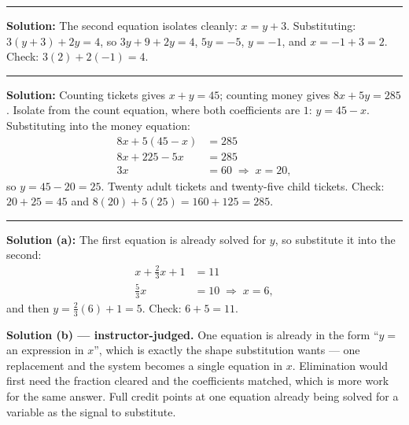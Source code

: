 \documentclass[12pt]{article}
\begin{document}
\vspace{0.15cm}\noindent\rule{\linewidth}{0.2pt}


\textbf{Solution:} \quad The second equation isolates cleanly: $x = y + 3$. Substituting:
$3(y + 3) + 2y = 4$, so $3y + 9 + 2y = 4$, $5y = -5$, $y = -1$, and $x = -1 + 3 = 2$.
Check: $3(2) + 2(-1) = 4$. 

\vspace{0.15cm}\noindent\rule{\linewidth}{0.2pt}


\textbf{Solution:} \quad Counting tickets gives $x + y = 45$; counting money gives
$8x + 5y = 285$. Isolate from the count equation, where both coefficients are $1$: $y = 45 - x$.
Substituting into the money equation:
\begin{align*}
  8x + 5(45 - x) &= 285\\
  8x + 225 - 5x &= 285\\
  3x &= 60 \;\Rightarrow\; x = 20,
\end{align*}
so $y = 45 - 20 = 25$. Twenty adult tickets and twenty-five child tickets.
Check: $20 + 25 = 45$ and $8(20) + 5(25) = 160 + 125 = 285$. 

\vspace{0.15cm}\noindent\rule{\linewidth}{0.2pt}


\textbf{Solution (a):} \quad The first equation is already solved for $y$, so substitute it into the
second:
\begin{align*}
  x + \tfrac{2}{3}x + 1 &= 11\\
  \tfrac{5}{3}x &= 10 \;\Rightarrow\; x = 6,
\end{align*}
and then $y = \tfrac{2}{3}(6) + 1 = 5$. Check: $6 + 5 = 11$. 

\noindent\textbf{Solution (b) --- instructor-judged.} One equation is already in the form
``$y =$ an expression in $x$'', which is exactly the shape substitution wants --- one replacement and
the system becomes a single equation in $x$. Elimination would first need the fraction cleared and
the coefficients matched, which is more work for the same answer. Full credit points at one equation
already being solved for a variable as the signal to substitute.
\end{document}
